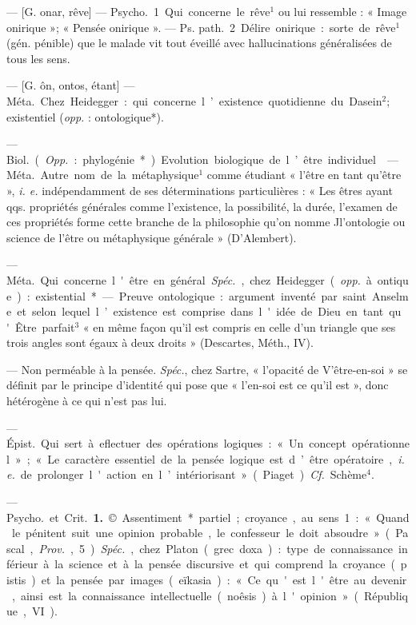 \begin{itemize}[leftmargin=1cm, label=, itemsep=1pt]
 — [G. onar, rêve] — \si{Psycho.}
1. Qui concerne le rêve$^1$ ou lui ressemble : « Image onirique »; « Pensée
onirique ». — \si{Ps. path.} 2 Délire
onirique : sorte de rêve$^1$ (gén. pénible) que le malade vit tout éveillé
avec hallucinations généralisées de
tous les sens.

 — [G. ôn, ontos, étant] — \si{Méta.}
Chez Heidegger : qui concerne l’existence quotidienne du Dasein$^2$; existentiel ({\it opp.} : ontologique*).

 — \si{Biol.} ({\it Opp.} : phylogénie*). Evolution biologique de
l’être individuel.

 — \si{Méta.} Autre nom de la
métaphysique$^1$ comme étudiant
« l'être en tant qu'être », {\it i. e.} indépendamment de ses déterminations
particulières : « Les êtres ayant qqs.
propriétés générales comme l’existence,
la possibilité, la durée, l’examen de ces propriétés forme cette
branche de la philosophie qu’on
nomme Jl’ontologie ou science de
l'être ou métaphysique générale »
(D’Alembert).

 — \si{Méta.} Qui concerne
l'être en général. {\it Spéc.}, chez Heidegger ({\it opp.} à ontique) : existential*. — Preuve ontologique : argument inventé par saint Anselme
et selon lequel l’existence est comprise dans l'idée de Dieu en tant
qu'Être parfait$^3$ « en même façon
qu'il est compris en celle d’un
triangle que ses trois angles sont
égaux à deux droits » (Descartes,
Méth., IV).

 — Non perméable à la pensée.
{\it Spéc.}, chez Sartre, « l’opacité de
V’être-en-soi » se définit par le principe d'identité qui pose que « l’en-soi
est ce qu’il est », donc hétérogène à
ce qui n’est pas lui.

 — \si{Épist.}
Qui sert à eflectuer des opérations
logiques : « Un concept opérationnel » ; « Le caractère essentiel de la
pensée logique est d’être opératoire,
{\it i. e.} de prolonger l'action en l’intériorisant » (Piaget). {\it Cf.} Schème$^4$.

 — \si{Psycho.} et \si{Crit.} {\bf 1.} ©
Assentiment* partiel ; croyance, au
sens 1 : « Quand le pénitent suit une
opinion probable, le confesseur le
doit absoudre » (Pascal, {\it Prov.}, 5).
{\it Spéc.}, chez Platon (grec doxa) : type
de connaissance inférieur à la science
et à la pensée discursive et qui comprend la croyance (pistis) et la
pensée par images (eïkasia) : « Ce
qu'est l'être au devenir, ainsi est la
connaissance intellectuelle (noêsis) à
l'opinion » (République, VI).


\end{itemize}
